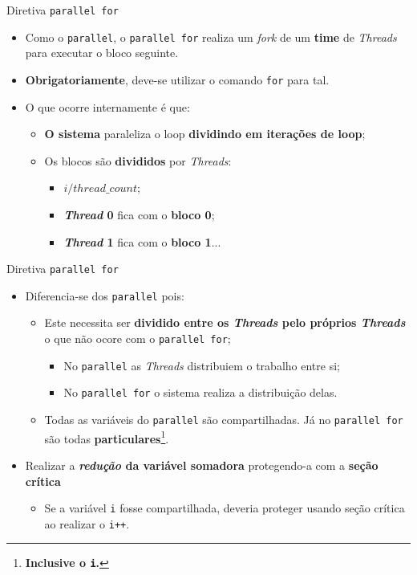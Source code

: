 \begin{frame}{Diretiva {\tt parallel for}}
	\begin{itemize}
	    \setlength\itemsep{1em}
		\item Como o {\tt parallel}, o {\tt parallel for} realiza um {\it fork} de um {\bf time} de \textit{Threads} para executar o bloco seguinte.
		\item {\bf Obrigatoriamente}, deve-se utilizar o comando {\tt for} para tal.
		\item O que ocorre internamente é que:
		\begin{itemize}
	        \setlength\itemsep{0.7em}
			\item {\bf O sistema} paraleliza o loop {\bf dividindo em iterações de loop};
			\item Os blocos são {\bf divididos} por \textit{Threads}:
			\begin{itemize}
				\item $i / thread\_count$;
				\item {\bf \textit{Thread} 0} fica com o {\bf bloco 0};
				\item {\bf \textit{Thread} 1} fica com o {\bf bloco 1}...
			\end{itemize}

		\end{itemize}

	\end{itemize}

\end{frame}


\begin{frame}{Diretiva {\tt parallel for}}
	\begin{itemize}
	    \setlength\itemsep{1em}
		\item Diferencia-se dos {\tt parallel} pois:
		\begin{itemize}
	        \setlength\itemsep{0.6em}
			\item Este necessita ser {\bf dividido entre os \textit{Threads} pelo próprios \textit{Threads}} o que não ocore com o {\tt parallel for};
			\begin{itemize}
				\item No {\tt parallel} as \textit{Threads} distribuiem o trabalho entre si;
				\item No {\tt parallel for} o sistema realiza a distribuição delas.
			\end{itemize}
			\item Todas as variáveis do {\tt parallel} são compartilhadas. Já no {\tt parallel for} são todas {\bf particulares}\footnote{\bf Inclusive o {\tt i}.}.
		\end{itemize}

		\item Realizar a {\bf \textit{redução} da variável somadora} protegendo-a com a {\bf seção crítica}
		\begin{itemize}
			\item Se a variável {\tt i} fosse compartilhada, deveria proteger usando seção crítica ao realizar o {\tt i++}.
		\end{itemize}

	\end{itemize}

\end{frame}

